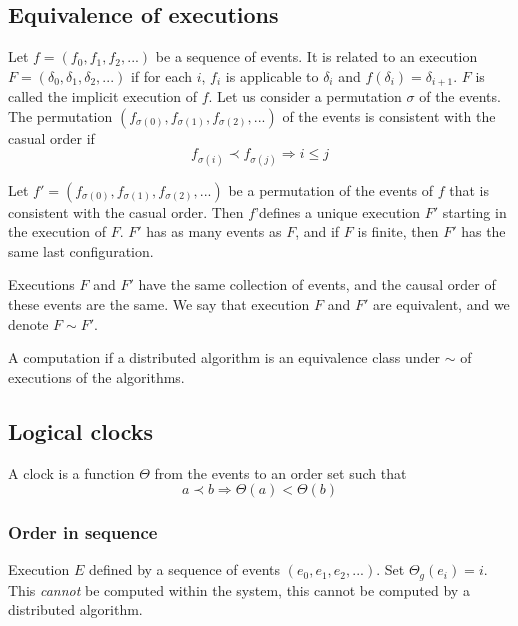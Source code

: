 \subsection{Equivalence of executions}
Let $f=(f_0,f_1,f_2,...)$ be a sequence of events. It is related to an execution $F=(\delta_0,\delta_1,\delta_2,...)$ if for each $i$, $f_i$ is applicable to $\delta_i$ and $f(\delta_i)=\delta_{i+1}$. $F$ is called the implicit execution of $f$. Let us consider a permutation $\sigma$ of the events. The permutation $(f_{\sigma(0)},f_{\sigma(1)},f_{\sigma(2)},...)$ of the events is consistent with the casual order if 
\[f_{\sigma (i)} \prec f_{\sigma(j)} \Rightarrow i \leq j\]

\begin{thm}
Let $f'=(f_{\sigma(0)},f_{\sigma(1)},f_{\sigma(2)},...)$ be a permutation of the events of $f$ that is consistent with the casual order. Then $f$'defines a unique execution $F'$ starting in the execution of $F$. $F'$ has as many events as $F$, and if $F$ is finite, then $F'$ has the same last configuration.
\end{thm}

Executions $F$ and $F'$ have the same collection of events, and the causal order of these events are the same. We say that execution $F$ and $F'$ are equivalent, and we denote $F\sim F'$.

\begin{defi}
A computation if a distributed algorithm is an equivalence class under $\sim$ of executions of the algorithms.
\end{defi} 


\subsection{Logical clocks}
\begin{defi}
A clock is a function $\Theta$ from the events to an order set such that
\[a \prec b \Rightarrow \Theta(a)<\Theta(b)\]
\end{defi}

\subsubsection{Order in sequence}
Execution $E$ defined by a sequence of events $(e_0,e_1,e_2,...)$. Set $\Theta_g (e_i)=i$. This \emph{cannot} be computed within the system, this cannot be computed by a distributed algorithm.

